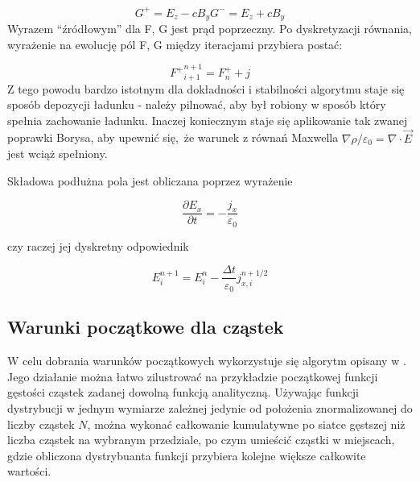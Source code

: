     \begin{equation}
        G^{+} = E_z - c B_y
        G^{-} = E_z + c B_y
        \label{eqn:Birdsall-electromagnetic-quantities-alternate-axes}
    \end{equation}
    Wyrazem ``źródłowym'' dla F, G jest prąd poprzeczny. Po dyskretyzacji równania, wyrażenie na ewolucję pól F, G między
    iteracjami przybiera postać:

    \begin{equation}
        {F^{+}}^{n+1}_{i+1} = F^{+}_{n} + j
    \end{equation}
    Z tego powodu bardzo istotnym dla dokładności i stabilności algorytmu staje się sposób depozycji ładunku - należy pilnować,
    aby był robiony w sposób który spełnia zachowanie ładunku. Inaczej koniecznym staje się aplikowanie tak zwanej
    poprawki Borysa, 
    aby upewnić się, że warunek z równań Maxwella $\nabla \rho / \varepsilon_0 = \nabla \cdot \vec{E}$ jest
    wciąż spełniony.

    Składowa podłużna pola jest obliczana poprzez wyrażenie

    \begin{equation}
    \frac{\partial E_x}{\partial t} = - \frac{j_x}{\varepsilon_0}
    \label{longitudinal-field-differential}
    \end{equation}

    czy raczej jej dyskretny odpowiednik

    \begin{equation}
        E_i^{n+1} = E_i^n - \frac{\Delta t}{\varepsilon_0} j_{x,i}^{n+1/2}
    \label{longitudinal-field-finite-differential}
    \end{equation}


    \subsection{Warunki początkowe dla cząstek}

    W celu dobrania warunków początkowych wykorzystuje się algorytm opisany w .
    Jego działanie można łatwo zilustrować na przykładzie początkowej funkcji gęstości cząstek zadanej
    dowolną funkcją analityczną. 
    Używając funkcji dystrybucji w jednym wymiarze zależnej jedynie od położenia znormalizowanej do
    liczby cząstek $N$, można wykonać całkowanie kumulatywne po siatce gęstszej niż liczba cząstek
    na wybranym przedziale, po czym umieścić cząstki w miejscach, gdzie obliczona dystrybuanta funkcji
    przybiera kolejne większe całkowite wartości.

